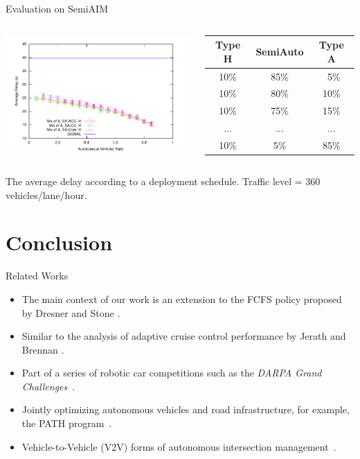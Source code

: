 \documentclass{beamer}
\begin{document}
\begin{frame}{Evaluation on SemiAIM}
\begin{columns}[c]
	\includegraphics[width=\columnwidth]{figures/figure_3.pdf}

	\small
	\begin{tabular}{|c|c|c|}
    \hline
     Type H&  SemiAuto &    Type A\\
    \hline
     10\%&     85\%&   \ 5\% \\
    \hline
     10\%&     80\%&  10\% \\
    \hline
     10\%&     75\%&  15\% \\
    \hline
      ...&  ... &  ...\\
    \hline
     10\%&       5\%&  85\% \\
    \hline
	\end{tabular}
\end{columns}

\hfill

The average delay according to a deployment schedule. Traffic level =
360 vehicles/lane/hour.
\end{frame}


\section{Conclusion}

\begin{frame}{Related Works}
\begin{itemize}
\item The main context of our work is an extension to the FCFS policy
proposed by Dresner and Stone \cite{bib:Dresner08Multiagent}.
\item Similar to the analysis of adaptive cruise control performance
by Jerath and Brennan \cite{bib:Jerath10adaptive}.
\item Part of a series of robotic car competitions such as the
\emph{DARPA Grand Challenges}~\cite{DARPAGrandChallenge}.
\item Jointly optimizing
autonomous vehicles and road infrastructure, for example, the PATH
program~\cite{bib:Shladover91Automated}.
\item Vehicle-to-Vehicle (V2V) forms of autonomous intersection
management~\cite{naumann97:intersection, ATT08-vanmiddlesworth}.
\end{itemize}
\end{frame}
\end{document}

